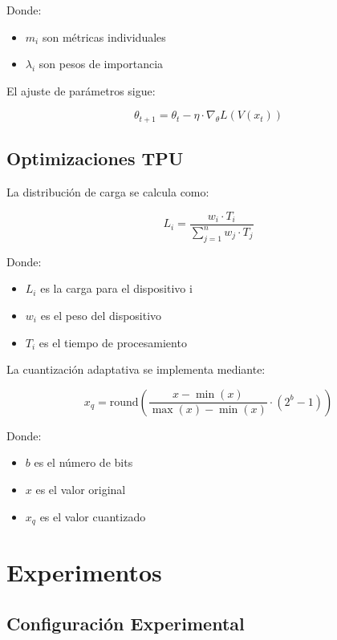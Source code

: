 \documentclass[12pt,a4paper]{article}
\begin{document}
Donde:
\begin{itemize}
    \item $m_i$ son métricas individuales
    \item $\lambda_i$ son pesos de importancia
\end{itemize}

El ajuste de parámetros sigue:

\begin{equation}
    \theta_{t+1} = \theta_t - \eta \cdot \nabla_\theta L(V(x_t))
\end{equation}

\subsection{Optimizaciones TPU}

La distribución de carga se calcula como:

\begin{equation}
    L_i = \frac{w_i \cdot T_i}{\sum_{j=1}^{n} w_j \cdot T_j}
\end{equation}

Donde:
\begin{itemize}
    \item $L_i$ es la carga para el dispositivo i
    \item $w_i$ es el peso del dispositivo
    \item $T_i$ es el tiempo de procesamiento
\end{itemize}

La cuantización adaptativa se implementa mediante:

\begin{equation}
    x_q = \text{round}\left(\frac{x - \min(x)}{\max(x) - \min(x)} \cdot (2^b - 1)\right)
\end{equation}

Donde:
\begin{itemize}
    \item $b$ es el número de bits
    \item $x$ es el valor original
    \item $x_q$ es el valor cuantizado
\end{itemize}

\section{Experimentos}

\subsection{Configuración Experimental}
\end{document}
